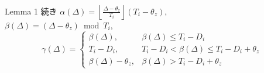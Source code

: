 \begin{frame}{Lemma 1 続き}
    \centering$\alpha(\Delta)=\left\lfloor\frac{\Delta-\theta_{z}}{T_{i}}\right\rfloor\left(T_{i}-\theta_{z}\right)$,\\
    \centering$\beta(\Delta)=\left(\Delta-\theta_{z}\right) \bmod T_{i}$,
    \begin{equation*}
        \gamma(\Delta)=\left\{\begin{array}{lr}
            \beta(\Delta),            & \beta(\Delta) \leq T_{i}-D_{i}                        \\
            T_{i}-D_{i},              & T_{i}-D_{i}<\beta(\Delta) \leq T_{i}-D_{i}+\theta_{z} \\
            \beta(\Delta)-\theta_{z}, & \beta(\Delta)>T_{i}-D_{i}+\theta_{z}
        \end{array}\right.
    \end{equation*}
\end{frame}


